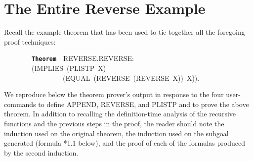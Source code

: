 \documentclass[11pt]{book}
\newenvironment{pubasis}{\begin{flushleft}\ttfamily\small}{\normalsize\rmfamily\end{flushleft}}
\newcommand{\axiomordefinition}[1]{\vspace{6pt}\texttt{\textbf{#1}}}
\newcommand{\pubdefaulttextsize}{\large}
\begin{document}
\section{The Entire Reverse Example}
\pubdefaulttextsize
Recall the example theorem that has been used to tie together all the foregoing proof techniques:
\begin{pubasis}
~~~~~~~~\axiomordefinition{Theorem}~~REVERSE.REVERSE:\\
~~~~~~~~(IMPLIES~(PLISTP~X)\\
~~~~~~~~~~~~~~~~~(EQUAL~(REVERSE~(REVERSE~X))~X)).\\
\end{pubasis}
We reproduce below the theorem prover's output
in response to the four user-commands to define APPEND, REVERSE,
and PLISTP and to prove the above theorem.
In addition to recalling the definition-time analysis of the recursive
functions and the previous steps in the proof, the reader
should note the induction used on the original theorem, the induction
used on the subgoal generated (formula *1.1 below), and the proof of
each of the formulas produced by the second induction.
\end{document}
